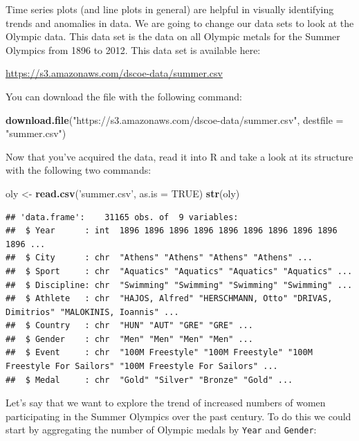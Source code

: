 \documentclass[]{book}
\newenvironment{Shaded}{\begin{snugshade}}{\end{snugshade}}
\newcommand{\KeywordTok}[1]{\textcolor[rgb]{0.13,0.29,0.53}{\textbf{{#1}}}}
\newcommand{\DataTypeTok}[1]{\textcolor[rgb]{0.13,0.29,0.53}{{#1}}}
\newcommand{\StringTok}[1]{\textcolor[rgb]{0.31,0.60,0.02}{{#1}}}
\newcommand{\OtherTok}[1]{\textcolor[rgb]{0.56,0.35,0.01}{{#1}}}
\newcommand{\NormalTok}[1]{{#1}}
\begin{document}
Time series plots (and line plots in general) are helpful in visually
identifying trends and anomalies in data. We are going to change our
data sets to look at the Olympic data. This data set is the data on all
Olympic metals for the Summer Olympics from 1896 to 2012. This data set
is available here:

\url{https://s3.amazonaws.com/dscoe-data/summer.csv}

You can download the file with the following command:

\begin{Shaded}
\begin{Highlighting}[]
\KeywordTok{download.file}\NormalTok{(}\StringTok{"https://s3.amazonaws.com/dscoe-data/summer.csv"}\NormalTok{, }\DataTypeTok{destfile =} \StringTok{"summer.csv"}\NormalTok{)}
\end{Highlighting}
\end{Shaded}

Now that you've acquired the data, read it into R and take a look at its
structure with the following two commands:

\begin{Shaded}
\begin{Highlighting}[]
\NormalTok{oly <-}\StringTok{ }\KeywordTok{read.csv}\NormalTok{(}\StringTok{'summer.csv'}\NormalTok{, }\DataTypeTok{as.is =} \OtherTok{TRUE}\NormalTok{)}
\KeywordTok{str}\NormalTok{(oly)}
\end{Highlighting}
\end{Shaded}

\begin{verbatim}
## 'data.frame':    31165 obs. of  9 variables:
##  $ Year      : int  1896 1896 1896 1896 1896 1896 1896 1896 1896 1896 ...
##  $ City      : chr  "Athens" "Athens" "Athens" "Athens" ...
##  $ Sport     : chr  "Aquatics" "Aquatics" "Aquatics" "Aquatics" ...
##  $ Discipline: chr  "Swimming" "Swimming" "Swimming" "Swimming" ...
##  $ Athlete   : chr  "HAJOS, Alfred" "HERSCHMANN, Otto" "DRIVAS, Dimitrios" "MALOKINIS, Ioannis" ...
##  $ Country   : chr  "HUN" "AUT" "GRE" "GRE" ...
##  $ Gender    : chr  "Men" "Men" "Men" "Men" ...
##  $ Event     : chr  "100M Freestyle" "100M Freestyle" "100M Freestyle For Sailors" "100M Freestyle For Sailors" ...
##  $ Medal     : chr  "Gold" "Silver" "Bronze" "Gold" ...
\end{verbatim}

Let's say that we want to explore the trend of increased numbers of
women participating in the Summer Olympics over the past century. To do
this we could start by aggregating the number of Olympic medals by
\texttt{Year} and \texttt{Gender}:
\end{document}
